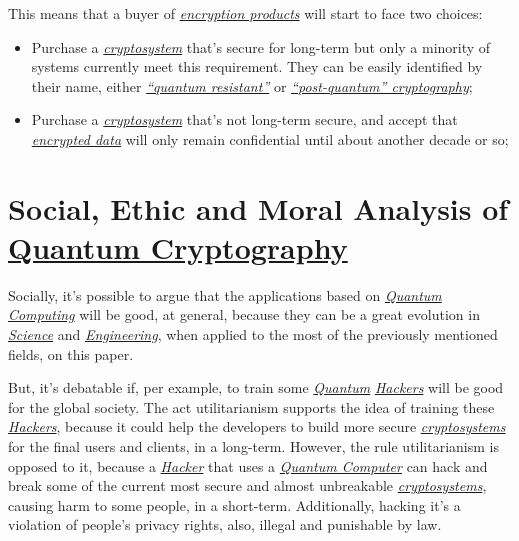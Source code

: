 \documentclass[conference]{IEEEtran}
\begin{document}
This means that a buyer of \href{https://en.wikipedia.org/wiki/Encryption_software}{\textit{encryption products}} will start to face two choices:

\begin{itemize}
    \item Purchase a \href{https://en.wikipedia.org/wiki/Cryptosystem}{\textit{cryptosystem}} that's secure for long-term but only a minority of systems currently meet this requirement. They can be easily identified by their name, either \href{https://en.wikipedia.org/wiki/Post-quantum_cryptography}{\textit{“quantum resistant”}} or \href{https://en.wikipedia.org/wiki/Post-quantum_cryptography}{\textit{“post-quantum” cryptography}};
    \item  Purchase a \href{https://en.wikipedia.org/wiki/Cryptosystem}{\textit{cryptosystem}} that's not long-term secure, and accept that \href{https://en.wikipedia.org/wiki/Encryption}{\textit{encrypted data}} will only remain confidential until about another decade or so;
\end{itemize}

\vspace{6pt}

\section{Social, Ethic and Moral Analysis of\\\href{https://en.wikipedia.org/wiki/Quantum_cryptography}{Quantum Cryptography}}

Socially, it's possible to argue that the applications based on \href{https://en.wikipedia.org/wiki/Quantum_computing}{\textit{Quantum Computing}} will be good, at general, because they can be a great evolution in \href{https://en.wikipedia.org/wiki/Science}{\textit{Science}} and \href{https://en.wikipedia.org/wiki/Science}{\textit{Engineering}}, when applied to the most of the previously mentioned fields, on this paper.

\vspace{4pt}

But, it's debatable if, per example, to train some \href{https://en.wikipedia.org/wiki/Quantum}{\textit{Quantum}} \href{https://en.wikipedia.org/wiki/Hacker}{\textit{Hackers}} will be good for the global society. The act utilitarianism supports the idea of training these \href{https://en.wikipedia.org/wiki/Hacker}{\textit{Hackers}}, because it could help the developers to build more secure \href{https://en.wikipedia.org/wiki/Cryptosystem}{\textit{cryptosystems}} for the final users and clients, in a long-term. However, the rule utilitarianism is opposed to it, because a \href{https://en.wikipedia.org/wiki/Hacker}{\textit{Hacker}} that uses a \href{https://en.wikipedia.org/wiki/Quantum_computing}{\textit{Quantum Computer}} can hack and break some of the current most secure and almost unbreakable \href{https://en.wikipedia.org/wiki/Cryptosystem}{\textit{cryptosystems}}, causing harm to some people, in a short-term. Additionally, hacking it's a violation of people's privacy rights, also, illegal and punishable by law.
\end{document}

